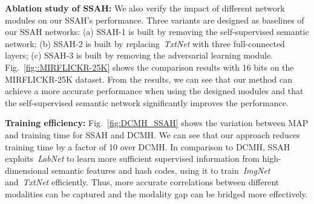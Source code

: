 \documentclass[10pt,twocolumn,letterpaper]{article}
\begin{document}
\textbf{Ablation study of SSAH:} We also verify the impact of different network modules on our SSAH's performance. Three variants are designed as baselines of our SSAH networks: (a) SSAH-1 is built by removing the self-supervised semantic network; (b) SSAH-2 is built by replacing~\emph{TxtNet} with three full-connected layers; (c) SSAH-3 is built by removing the adversarial learning module. Fig.~\ref{fig::MIRFLICKR-25K} shows the comparison results with 16 bits on the MIRFLICKR-25K dataset. From the results, we can see that our method can achieve a more accurate performance when using the designed modules and that the self-supervised semantic network significantly improves the performance.

\textbf{Training efficiency:} Fig.~\ref{fig:DCMH_SSAH} shows the variation between MAP and training time for SSAH and DCMH. We can see that our approach reduces training time by a factor of 10 over DCMH. In comparison to DCMH, SSAH exploits~\emph{LabNet} to learn more sufficient supervised information from high-dimensional semantic features and hash codes, using it to train~\emph{ImgNet} and~\emph{TxtNet} efficiently. Thus, more accurate correlations between different modalities can be captured and the modality gap can be  bridged more effectively.
\end{document}
